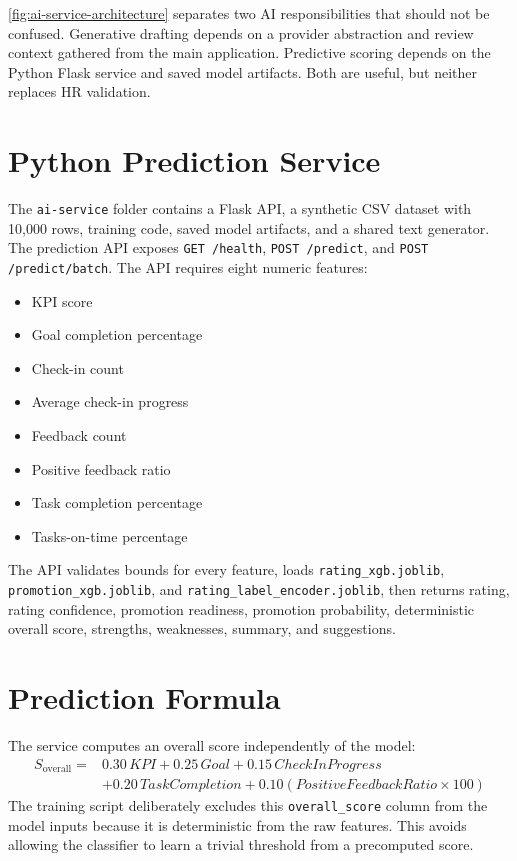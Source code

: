\cref{fig:ai-service-architecture} separates two AI responsibilities that should not be confused. Generative drafting depends on a provider abstraction and review context gathered from the main application. Predictive scoring depends on the Python Flask service and saved model artifacts. Both are useful, but neither replaces HR validation.

\section{Python Prediction Service}
The \texttt{ai-service} folder contains a Flask API, a synthetic CSV dataset with 10,000 rows, training code, saved model artifacts, and a shared text generator. The prediction API exposes \texttt{GET /health}, \texttt{POST /predict}, and \texttt{POST /predict/batch}. The API requires eight numeric features:
\begin{itemize}
\item KPI score
\item Goal completion percentage
\item Check-in count
\item Average check-in progress
\item Feedback count
\item Positive feedback ratio
\item Task completion percentage
\item Tasks-on-time percentage
\end{itemize}

The API validates bounds for every feature, loads \texttt{rating\_xgb.joblib}, \texttt{promotion\_xgb.joblib}, and \texttt{rating\_label\_encoder.joblib}, then returns rating, rating confidence, promotion readiness, promotion probability, deterministic overall score, strengths, weaknesses, summary, and suggestions.

\section{Prediction Formula}
The service computes an overall score independently of the model:
\[
\begin{aligned}
S_{\mathrm{overall}}={}&0.30\,KPI
+0.25\,Goal
+0.15\,CheckInProgress\\
&+0.20\,TaskCompletion
+0.10(PositiveFeedbackRatio \times 100)
\end{aligned}
\]
The training script deliberately excludes this \texttt{overall\_score} column from the model inputs because it is deterministic from the raw features. This avoids allowing the classifier to learn a trivial threshold from a precomputed score.

